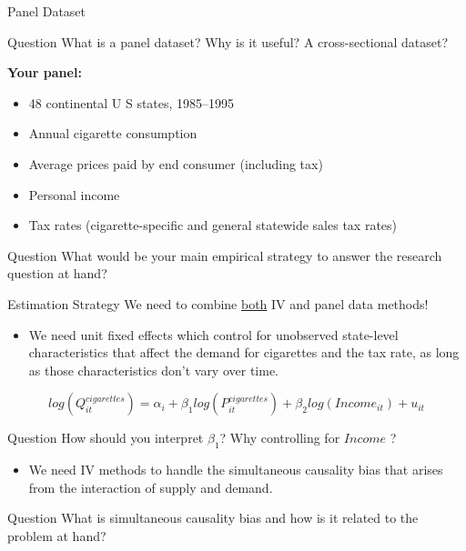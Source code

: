 \documentclass[notes,10pt, aspectratio=169]{beamer}
\begin{document}
\begin{frame}{Panel Dataset}
\begin{exampleblock}{Question}
    What is a panel dataset? Why is it useful? A cross-sectional dataset?
\end{exampleblock}
\vspace{.5cm}
\textbf{Your panel:}
\begin{itemize}
    \item 48 continental U S states, 1985–1995
    \item Annual cigarette consumption
    \item Average prices paid by end consumer (including tax)
    \item Personal income
    \item Tax rates (cigarette-specific and general statewide sales tax rates)
\end{itemize}
\begin{exampleblock}{Question}
    What would be your main empirical strategy to answer the research question at hand?
\end{exampleblock}

\end{frame}


\begin{frame}{Estimation Strategy}
We need to combine \underline{both} IV and panel data methods! \\[.25em]
\begin{itemize}
    \item[$\longrightarrow$] We need unit fixed effects which control for unobserved state-level characteristics that affect the demand for cigarettes and the tax rate, as long as those characteristics don’t vary over time.
\end{itemize}
\begin{equation*}
    log(Q^{cigarettes}_{it}) = \alpha_i + \beta_1 log(P^{cigarettes}_{it}) + \beta_2 log(Income_{it}) + u_{it}
\end{equation*}
\begin{exampleblock}{Question}
    How should you interpret $\beta_1$? Why controlling for $Income$ ? 
\end{exampleblock}

\begin{itemize}
   \item[$\longrightarrow$] We need IV methods to handle the simultaneous causality bias that arises from the interaction of supply and demand.\\[1em]
\end{itemize}


\begin{exampleblock}{Question}
    What is simultaneous causality bias and how is it related to the problem at hand?
\end{exampleblock}

\end{frame}
\end{document}
